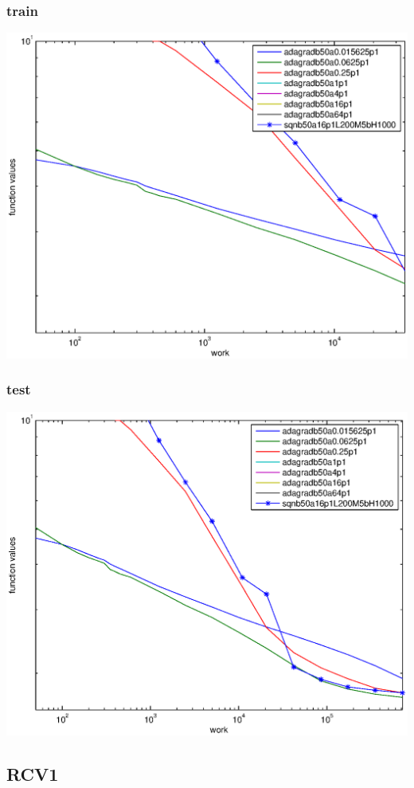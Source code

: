 \documentclass[12pt]{article}
\begin{document}
\subsubsection{train}
\includegraphics[scale=1]{paperOnImpFigures/speech-adagrad-l-train.eps}
\subsubsection{test}
\includegraphics[scale=1]{paperOnImpFigures/speech-adagrad-l-test.eps}


\subsection{RCV1}
\end{document}
